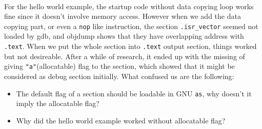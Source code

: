 \paragraph{}
For the hello world example, the startup code without data copying loop works fine since it doesn't involve memory access.
However when we add the data copying part, or even a \texttt{nop} like instruction,
the section \texttt{.isr\_vector} seemed not loaded by gdb, and objdump shows that they have overlapping address with \texttt{.text}.
When we put the whole section into \texttt{.text} output section, things worked but not desireable.
After a while of research, it ended up with the missing of giving \texttt{"a"}(allocatable) flag to the section,
which showed that it might be considered as debug section initially.
What confused us are the following:
\begin{itemize}
\item The default flag of a section should be loadable in GNU \texttt{as}, why doesn't it imply the allocatable flag?
\item Why did the hello world example worked without allocatable flag?
\end{itemize}
